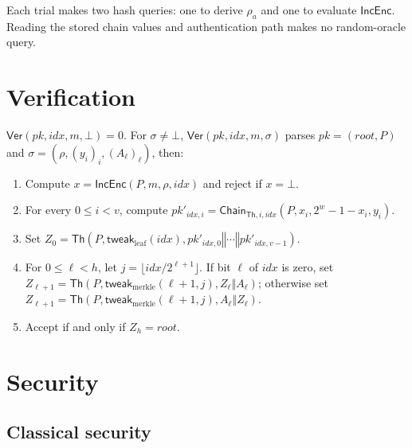 \documentclass[11pt]{article}
\theoremstyle{definition}
\theoremstyle{plain}
\theoremstyle{remark}
\newcommand{\Th}{\mathsf{Th}}
\newcommand{\IncEnc}{\mathsf{IncEnc}}
\newcommand{\Ver}{\mathsf{Ver}}
\newcommand{\Chain}{\mathsf{Chain}}
\newcommand{\concat}{\mathbin\Vert}
\newcommand{\idx}{\mathit{idx}}
\newcommand{\pk}{\mathit{pk}}
\newcommand{\rootnode}{\mathit{root}}
\begin{document}
Each trial makes two hash queries: one to derive $\rho_a$ and one to evaluate $\IncEnc$. Reading the stored chain values and authentication path makes no random-oracle query.

\section{Verification}

$\Ver(\pk,\idx,m,\bot)=0$. For $\sigma\neq\bot$, $\Ver(\pk,\idx,m,\sigma)$ parses $\pk=(\rootnode,P)$ and $\sigma=(\rho,(y_i)_i,(A_\ell)_\ell)$, then:
\begin{enumerate}[leftmargin=2em]
\item Compute $x=\IncEnc(P,m,\rho,\idx)$ and reject if $x=\bot$.
\item For every $0\leq i<v$, compute $\mathit{pk}'_{\idx,i}=\Chain_{\Th,i,\idx}(P,x_i,2^w-1-x_i,y_i)$.
\item Set $Z_0=\Th(P,\mathsf{tweak}_{\mathrm{leaf}}(\idx),\mathit{pk}'_{\idx,0}\concat\cdots\concat\mathit{pk}'_{\idx,v-1})$.
\item For $0\leq\ell<h$, let $j=\lfloor\idx/2^{\ell+1}\rfloor$. If bit $\ell$ of $\idx$ is zero, set $Z_{\ell+1}=\Th(P,\mathsf{tweak}_{\mathrm{merkle}}(\ell+1,j),Z_\ell\concat A_\ell)$; otherwise set $Z_{\ell+1}=\Th(P,\mathsf{tweak}_{\mathrm{merkle}}(\ell+1,j),A_\ell\concat Z_\ell)$.
\item Accept if and only if $Z_h=\rootnode$.
\end{enumerate}

\section{Security}
\label{sec:security}

\subsection{Classical security}
\end{document}
